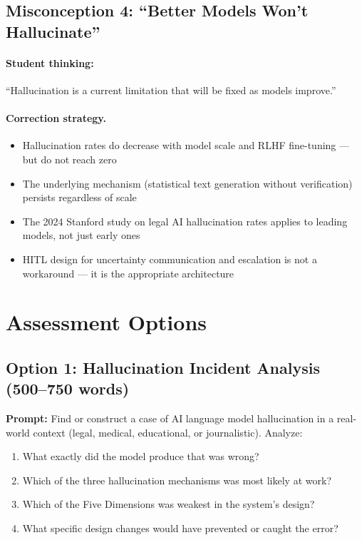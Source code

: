 \subsection{Misconception 4: ``Better Models Won't Hallucinate''}

\paragraph{Student thinking:} ``Hallucination is a current limitation that will be fixed as models improve.''

\paragraph{Correction strategy.}
\begin{itemize}
    \item Hallucination rates do decrease with model scale and RLHF fine-tuning --- but do not reach zero
    \item The underlying mechanism (statistical text generation without verification) persists regardless of scale
    \item The 2024 Stanford study on legal AI hallucination rates applies to leading models, not just early ones
    \item HITL design for uncertainty communication and escalation is not a workaround --- it is the appropriate architecture
\end{itemize}

\section{Assessment Options}

\subsection{Option 1: Hallucination Incident Analysis (500--750 words)}

\textbf{Prompt:} Find or construct a case of AI language model hallucination in a real-world context (legal, medical, educational, or journalistic). Analyze:
\begin{enumerate}
    \item What exactly did the model produce that was wrong?
    \item Which of the three hallucination mechanisms was most likely at work?
    \item Which of the Five Dimensions was weakest in the system's design?
    \item What specific design changes would have prevented or caught the error?
\end{enumerate}


